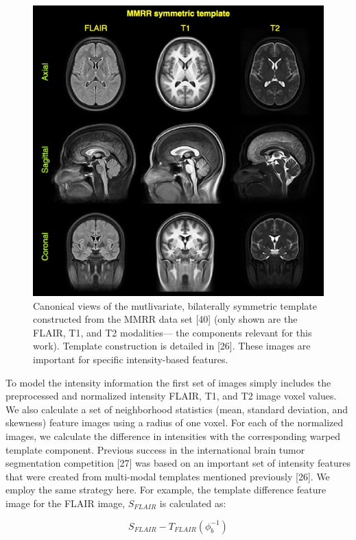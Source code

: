 \documentclass[11pt,]{article}
\begin{document}
\begin{figure}[htbp]
\centering
\includegraphics{Figures/MMRR.png}
\caption{Canonical views of the mutlivariate, bilaterally symmetric
template constructed from the MMRR data set {[}40{]} (only shown are the
FLAIR, T1, and T2 modalities--- the components relevant for this work).
Template construction is detailed in {[}26{]}. These images are
important for specific intensity-based features.}
\end{figure}

To model the intensity information the first set of images simply
includes the preprocessed and normalized intensity FLAIR, T1, and T2
image voxel values. We also calculate a set of neighborhood statistics
(mean, standard deviation, and skewness) feature images using a radius
of one voxel. For each of the normalized images, we calculate the
difference in intensities with the corresponding warped template
component. Previous success in the international brain tumor
segmentation competition {[}27{]} was based on an important set of
intensity features that were created from multi-modal templates
mentioned previously {[}26{]}. We employ the same strategy here. For
example, the template difference feature image for the FLAIR image,
\(S_{FLAIR}\) is calculated as:

\[S_{FLAIR} - T_{FLAIR}\left(\phi_b^{-1}\right)\]
\end{document}
